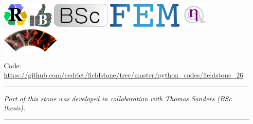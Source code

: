 \includegraphics[height=1.25cm]{images/pictograms/replication}
\includegraphics[height=1.25cm]{images/pictograms/benchmark}
\includegraphics[height=1.25cm]{images/pictograms/bsc}
\includegraphics[height=1.25cm]{images/pictograms/FEM}
\includegraphics[height=1.25cm]{images/pictograms/nonlinear}
\includegraphics[height=1.25cm]{images/pictograms/aspect_logo}




\begin{center}
\inpython
{\small Code: \url{https://github.com/cedrict/fieldstone/tree/master/python_codes/fieldstone_26}}
\end{center}


\par\noindent\rule{\textwidth}{0.4pt}

{\sl Part of this stone was developed in collaboration with Thomas Sanders (BSc thesis).} 

\par\noindent\rule{\textwidth}{0.4pt}



